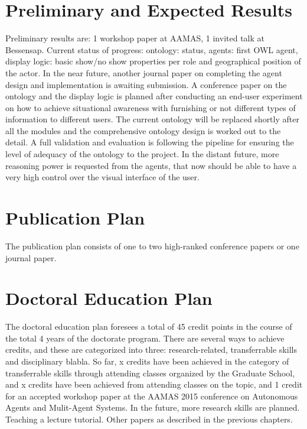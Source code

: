\chapter{Preliminary and Expected Results}

Preliminary results are: 1 workshop paper at AAMAS, 1 invited talk at Bessensap. 
Current status of progress: ontology: status, agents: first OWL agent, display logic: basic show/no show properties per role and geographical position of the actor. 
In the near future, another journal paper on completing the agent design and implementation is awaiting submission. A conference paper on the ontology and the display logic is planned after conducting an end-user experiment on how to achieve situational awareness with furnishing or not different types of information to different users. The current ontology will be replaced shortly after all the modules and the comprehensive ontology design is worked out to the detail. A full validation and evaluation is following the pipeline for ensuring the level of adequacy of the ontology to the project.
In the distant future, more reasoning power is requested from the agents, that now should be able to have a very high control over the visual interface of the user. 

\chapter{Publication Plan}

The publication plan consists of one to two high-ranked conference papers or one journal paper. 

\chapter{Doctoral Education Plan}
The doctoral education plan foresees a total of 45 credit points in the course of the total 4 years of the doctorate program. There are several ways to achieve credits, and these are categorized into three: research-related, transferrable skills and disciplinary blabla. So far, x credits have been achieved in the category of transferrable skills through attending classes organized by the Graduate School, and x credits have been achieved from attending classes on the topic, and 1 credit for an accepted workshop paper at the AAMAS 2015 conference on Autonomous Agents and Mulit-Agent Systems.
In the future, more research skills are planned.
Teaching a lecture tutorial.
Other papers as described in the previous chapters.

  